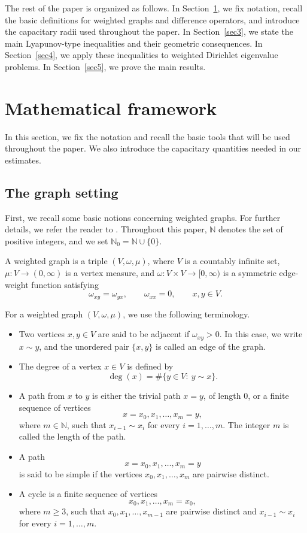\documentclass[twoside,12pt,letter]{article}
\theoremstyle{plain}
\theoremstyle{definition}
\theoremstyle{remark}
\numberwithin{equation}{section}
\begin{document}
The rest of the paper is organized as follows. In Section~\ref{sec2}, we fix
notation, recall the basic definitions for weighted graphs and difference
operators, and introduce the capacitary radii used throughout the paper. In
Section~\ref{sec3}, we state the main Lyapunov-type inequalities and their
geometric consequences. In Section~\ref{sec4}, we apply these inequalities to
weighted Dirichlet eigenvalue problems. In Section~\ref{sec5}, we prove the
main results.

\section{Mathematical framework}\label{sec2}

In this section, we fix the notation and recall the basic tools that will be
used throughout the paper. We also introduce the capacitary quantities needed
in our estimates.

\subsection{The graph setting}

First, we recall some basic notions concerning weighted graphs. For further
details, we refer the reader to \cite{Grigoryan2018}. Throughout this paper,
\(\mathbb{N}\) denotes the set of positive integers, and we set
\(\mathbb{N}_0=\mathbb{N}\cup\{0\}\).

A weighted graph is a triple \((V,\omega,\mu)\), where \(V\) is a countably
infinite set, \(\mu:V\to(0,\infty)\) is a vertex measure, and
\(\omega:V\times V\to[0,\infty)\) is a symmetric edge-weight function satisfying
\[
\omega_{xy}=\omega_{yx},\qquad \omega_{xx}=0,\qquad x,y\in V.
\]

For a weighted graph \((V,\omega,\mu)\), we use the following terminology.
\begin{itemize}
\item Two vertices \(x,y\in V\) are said to be adjacent if \(\omega_{xy}>0\).
In this case, we write \(x\sim y\), and the unordered pair \(\{x,y\}\) is called
an edge of the graph.

\item The degree of a vertex \(x\in V\) is defined by
\[
\deg(x)=\#\{y\in V:\ y\sim x\}.
\]

\item A path from \(x\) to \(y\) is either the trivial path \(x=y\), of length
\(0\), or a finite sequence of vertices
\[
x=x_0,x_1,\ldots,x_m=y,
\]
where \(m\in\mathbb{N}\), such that \(x_{i-1}\sim x_i\) for every
\(i=1,\ldots,m\). The integer \(m\) is called the length of the path.

\item A path
\[
x=x_0,x_1,\ldots,x_m=y
\]
is said to be simple if the vertices \(x_0,x_1,\ldots,x_m\) are pairwise
distinct.

\item A cycle is a finite sequence of vertices
\[
x_0,x_1,\ldots,x_m=x_0,
\]
where \(m\ge 3\), such that \(x_0,x_1,\ldots,x_{m-1}\) are pairwise distinct and
\(x_{i-1}\sim x_i\) for every \(i=1,\ldots,m\).
\end{itemize}
\end{document}
